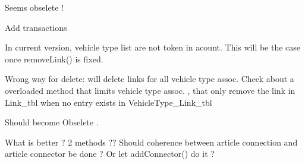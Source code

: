 \begin{DoxyRefList}
\item[\label{todo__todo000092}%
\hypertarget{todo__todo000092}{}%
Class \hyperlink{classmdt_basic_state_machine}{mdt\-Basic\-State\-Machine$<$ S $>$} ]Seems obselete !  
\item[\label{todo__todo000054}%
\hypertarget{todo__todo000054}{}%
Member \hyperlink{classmdt_cl_direct_link_aa7a155c3bf99b91e2d9cff85e93f332b}{mdt\-Cl\-Direct\-Link\-:\-:add\-Links\-By\-Unit\-Connector} (const Q\-Variant unit\-Connector\-Id\-S, const Q\-Variant unit\-Connector\-Id\-E, \hyperlink{classmdt_cl_path_graph}{mdt\-Cl\-Path\-Graph} $\ast$graph)]Add transactions  
\item[\label{todo__todo000056}%
\hypertarget{todo__todo000056}{}%
Member \hyperlink{classmdt_cl_link_ac32bfef9f23b431ea4d3d546e6c21361}{mdt\-Cl\-Link\-:\-:disconnect\-Connectors} (const Q\-Variant \&start\-Unit\-Connector\-Id, const Q\-Variant \&end\-Unit\-Connector\-Id, const Q\-List$<$ Q\-Variant $>$ \&start\-Vehicle\-Type\-Id\-List, const Q\-List$<$ Q\-Variant $>$ \&end\-Vehicle\-Type\-Id\-List)]In current version, vehicle type list are not token in acount. This will be the case once remove\-Link() is fixed.  
\item[\label{todo__todo000055}%
\hypertarget{todo__todo000055}{}%
Member \hyperlink{classmdt_cl_link_a865c0cee1fab1c9209d139dcd70f9fbd}{mdt\-Cl\-Link\-:\-:remove\-Link} (const Q\-Variant \&unit\-Connection\-Start\-Id, const Q\-Variant \&unit\-Connection\-End\-Id, bool handle\-Transaction=true)]Wrong way for delete\-: will delete links for all vehicle type assoc. Check about a overloaded method that limits vehicle type assoc. , that only remove the link in Link\-\_\-tbl when no entry exists in Vehicle\-Type\-\_\-\-Link\-\_\-tbl  
\item[\label{todo__todo000057}%
\hypertarget{todo__todo000057}{}%
Member \hyperlink{classmdt_cl_path_graph_a63ddfb9e8d64041ad17c992eac172a8a}{mdt\-Cl\-Path\-Graph\-:\-:last\-Error\-Message} () const ]Should become Obselete .  
\item[\label{todo__todo000058}%
\hypertarget{todo__todo000058}{}%
Member \hyperlink{classmdt_cl_unit_a9aa3d52f4e6d79fa003d96e04be8223e}{mdt\-Cl\-Unit\-:\-:add\-Connection\-Data\-List\-From\-Article\-Connection\-Id\-List} (\hyperlink{classmdt_cl_unit_connector_data}{mdt\-Cl\-Unit\-Connector\-Data} \&data, const Q\-List$<$ Q\-Variant $>$ \&article\-Connection\-Id\-List, bool copy\-Contact\-Name)]What is better ? 2 methods ?? Should coherence between article connection and article connector be done ? Or let add\-Connector() do it ? 

\end{DoxyRefList}
